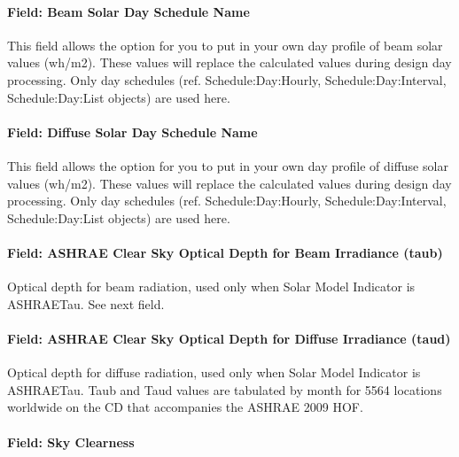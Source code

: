 \paragraph{Field: Beam Solar Day Schedule Name}\label{field-beam-solar-day-schedule-name}

This field allows the option for you to put in your own day profile of beam solar values (wh/m2). These values will replace the calculated values during design day processing. Only day schedules (ref. Schedule:Day:Hourly, Schedule:Day:Interval, Schedule:Day:List objects) are used here.

\paragraph{Field: Diffuse Solar Day Schedule Name}\label{field-diffuse-solar-day-schedule-name}

This field allows the option for you to put in your own day profile of diffuse solar values (wh/m2). These values will replace the calculated values during design day processing. Only day schedules (ref. Schedule:Day:Hourly, Schedule:Day:Interval, Schedule:Day:List objects) are used here.

\paragraph{Field: ASHRAE Clear Sky Optical Depth for Beam Irradiance (taub)}\label{field-ashrae-clear-sky-optical-depth-for-beam-irradiance-taub}

Optical depth for beam radiation, used only when Solar Model Indicator is ASHRAETau. See next field.

\paragraph{Field: ASHRAE Clear Sky Optical Depth for Diffuse Irradiance (taud)}\label{field-ashrae-clear-sky-optical-depth-for-diffuse-irradiance-taud}

Optical depth for diffuse radiation, used only when Solar Model Indicator is ASHRAETau. Taub and Taud values are tabulated by month for 5564 locations worldwide on the CD that accompanies the ASHRAE 2009 HOF.

\paragraph{Field: Sky Clearness}\label{field-sky-clearness}

